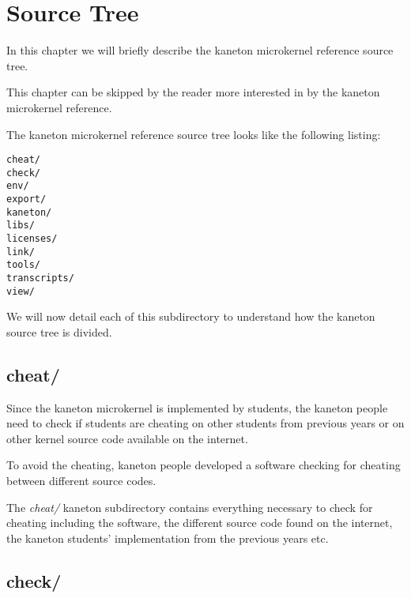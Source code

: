 
%
%

\chapter{Source Tree}

In this chapter we will briefly describe the kaneton microkernel reference
source tree.

This chapter can be skipped by the reader more interested in by the
kaneton microkernel reference.

\newpage

%
%

The kaneton microkernel reference source tree looks like the following
listing:

\begin{verbatim}
cheat/
check/
env/
export/
kaneton/
libs/
licenses/
link/
tools/
transcripts/
view/
\end{verbatim}

We will now detail each of this subdirectory to understand how the
kaneton source tree is divided.

%
%

\section{cheat/}

Since the kaneton microkernel is implemented by students, the kaneton
people need to check if students are cheating on other students from
previous years or on other kernel source code available on the internet.

To avoid the cheating, kaneton people developed a software checking
for cheating between different source codes.

The \textit{cheat/} kaneton subdirectory contains everything necessary
to check for cheating including the software, the different source code
found on the internet, the kaneton students' implementation from the
previous years etc.

%
%

\section{check/}

